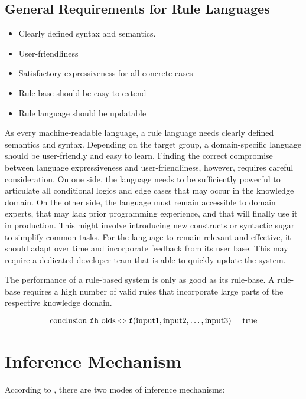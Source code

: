 \subsection{General Requirements for Rule Languages}\label{subsec:general-rule-language-requirements}

\begin{itemize}
    \item Clearly defined syntax and semantics.
    \item User-friendliness
    \item Satisfactory expressiveness for all concrete cases
    \item Rule base should be easy to extend
    \item Rule language should be updatable
\end{itemize}

As every machine-readable language, a rule language needs clearly defined semantics and syntax.
Depending on the target group, a domain-specific language should be user-friendly and easy to learn.
Finding the correct compromise between language expressiveness and user-friendliness\cite{https://doi.org/10.1002/widm.11},
however, requires careful consideration.
On one side, the language needs
to be sufficiently powerful to articulate all conditional logics and edge cases that may occur in the knowledge domain.
On the other side, the language must remain accessible to domain experts,
that may lack prior programming experience, and that will finally use it in production.
This might involve introducing new constructs or syntactic sugar to simplify common tasks.
For the language to remain relevant and effective, it should adapt over time and incorporate feedback from its user base.
This may require a dedicated developer team that is able to quickly update the system.

The performance of a rule-based system is only as good as its rule-base. 
A rule-base requires a high number of valid rules that incorporate large parts of the respective knowledge domain.

\[
    \text{conclusion \texttt{f}h olds} \Leftrightarrow \texttt{f}(\text{input1}, \text{input2}, \ldots, \text{input3}) = \text{true}
\]

\section{Inference Mechanism}\label{sec:inference-mechanism}

According to \cite{https://doi.org/10.1002/widm.11}, there are two modes of inference mechanisms:


